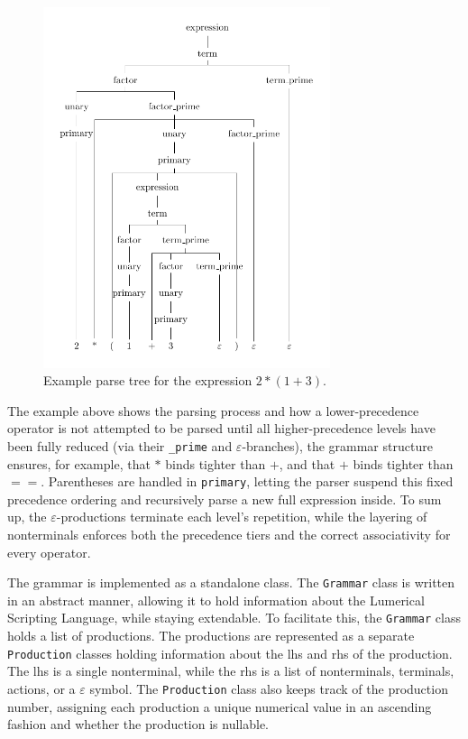 \begin{figure}[H]\label{fig:parse-example}
  \centering
  \includegraphics[width=0.75\textwidth]{figures/parse-example.pdf}
  \caption{Example parse tree for the expression $2*(1+3)$.}
\end{figure}

The example above shows the parsing process and how a lower-precedence operator is not attempted to be parsed until all higher-precedence levels have been fully reduced (via their \texttt{\_prime} and $\varepsilon$-branches), the grammar structure ensures, for example, that $*$ binds tighter than $+$, and that $+$ binds tighter than $==$. Parentheses are handled in \texttt{primary}, letting the parser suspend this fixed precedence ordering and recursively parse a new full expression inside. To sum up, the $\varepsilon$-productions terminate each level's repetition, while the layering of nonterminals enforces both the precedence tiers and the correct associativity for every operator.


The grammar is implemented as a standalone class. The \texttt{Grammar} class is written in an abstract manner, allowing it to hold information about the Lumerical Scripting Language, while staying extendable. To facilitate this, the \texttt{Grammar} class holds a list of productions. The productions are represented as a separate \texttt{Production} classes holding information about the \gls{lhs} and \gls{rhs} of the production. The \gls{lhs} is a single nonterminal, while the \gls{rhs} is a list of nonterminals, terminals, actions, or a $\varepsilon$ symbol. The \texttt{Production} class also keeps track of the production number, assigning each production a unique numerical value in an ascending fashion and whether the production is nullable.

